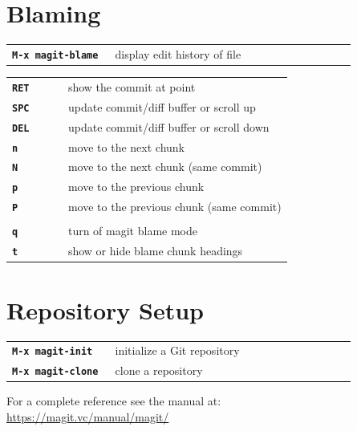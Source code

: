\documentclass[9pt]{extarticle} %
\begin{document}
\begin{multicols}{3}
  \section*{Blaming}

  \begin{tabular}{L{0.30\linewidth} L{0.70\linewidth}}
    \tt \textbf{M-x magit-blame} & display edit history of file
  \end{tabular}
  \begin{tabular}{L{0.20\linewidth} L{0.80\linewidth}}
    \tt \textbf{RET} & show the commit at point \\
    \tt \textbf{SPC} & update commit/diff buffer or scroll up \\
    \tt \textbf{DEL} & update commit/diff buffer or scroll down \\
    \tt \textbf{n} & move to the next chunk \\
    \tt \textbf{N} & move to the next chunk (same commit) \\
    \tt \textbf{p} & move to the previous chunk \\
    \tt \textbf{P} & move to the previous chunk (same commit) \\\\
    \tt \textbf{q} & turn of magit blame mode \\
    \tt \textbf{t} & show or hide blame chunk headings
  \end{tabular}

  \vspace{5ex}

  \section*{Repository Setup}

  \begin{tabular}{L{0.30\linewidth} L{0.70\linewidth}}
    \tt \textbf{M-x magit-init} & initialize a Git repository \\
    \tt \textbf{M-x magit-clone} & clone a repository
  \end{tabular}

  \vspace{5ex}

  For a complete reference see the manual at: \\
  \url{https://magit.vc/manual/magit/}

\end{multicols}
\end{document}
